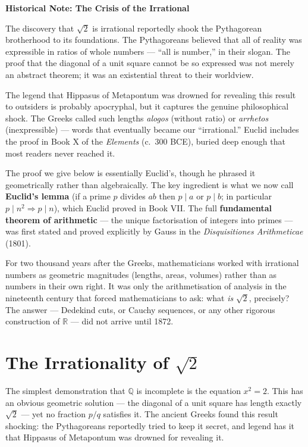 \documentclass[12pt, openany]{book}
\theoremstyle{plain}
\theoremstyle{definition}
\theoremstyle{remark}
\newcommand{\Q}{\mathbb{Q}}
\newcommand{\R}{\mathbb{R}}
\begin{document}
\begin{remarkbox}
\textbf{Historical Note: The Crisis of the Irrational}

The discovery that $\sqrt{2}$ is irrational reportedly shook the Pythagorean brotherhood to its foundations. The Pythagoreans believed that all of reality was expressible in ratios of whole numbers --- ``all is number,'' in their slogan. The proof that the diagonal of a unit square cannot be so expressed was not merely an abstract theorem; it was an existential threat to their worldview.

The legend that Hippasus of Metapontum was drowned for revealing this result to outsiders is probably apocryphal, but it captures the genuine philosophical shock. The Greeks called such lengths \emph{alogos} (without ratio) or \emph{arrhetos} (inexpressible) --- words that eventually became our ``irrational.'' Euclid includes the proof in Book X of the \emph{Elements} (c.\ 300 BCE), buried deep enough that most readers never reached it.

The proof we give below is essentially Euclid's, though he phrased it geometrically rather than algebraically. The key ingredient is what we now call \textbf{Euclid's lemma} (if a prime $p$ divides $ab$ then $p \mid a$ or $p \mid b$; in particular $p \mid n^2 \Rightarrow p \mid n$), which Euclid proved in Book VII. The full \textbf{fundamental theorem of arithmetic} --- the unique factorisation of integers into primes --- was first stated and proved explicitly by Gauss in the \emph{Disquisitiones Arithmeticae} (1801).

For two thousand years after the Greeks, mathematicians worked with irrational numbers as geometric magnitudes (lengths, areas, volumes) rather than as numbers in their own right. It was only the arithmetisation of analysis in the nineteenth century that forced mathematicians to ask: what \emph{is} $\sqrt{2}$, precisely? The answer --- Dedekind cuts, or Cauchy sequences, or any other rigorous construction of $\R$ --- did not arrive until 1872.
\end{remarkbox}
\color{black}

\section{The Irrationality of \texorpdfstring{$\sqrt{2}$}{sqrt 2}}

The simplest demonstration that $\Q$ is incomplete is the equation $x^2 = 2$.  This has an obvious geometric solution --- the diagonal of a unit square has length exactly $\sqrt{2}$ --- yet no fraction $p/q$ satisfies it.  The ancient Greeks found this result shocking: the Pythagoreans reportedly tried to keep it secret, and legend has it that Hippasus of Metapontum was drowned for revealing it.
\end{document}
